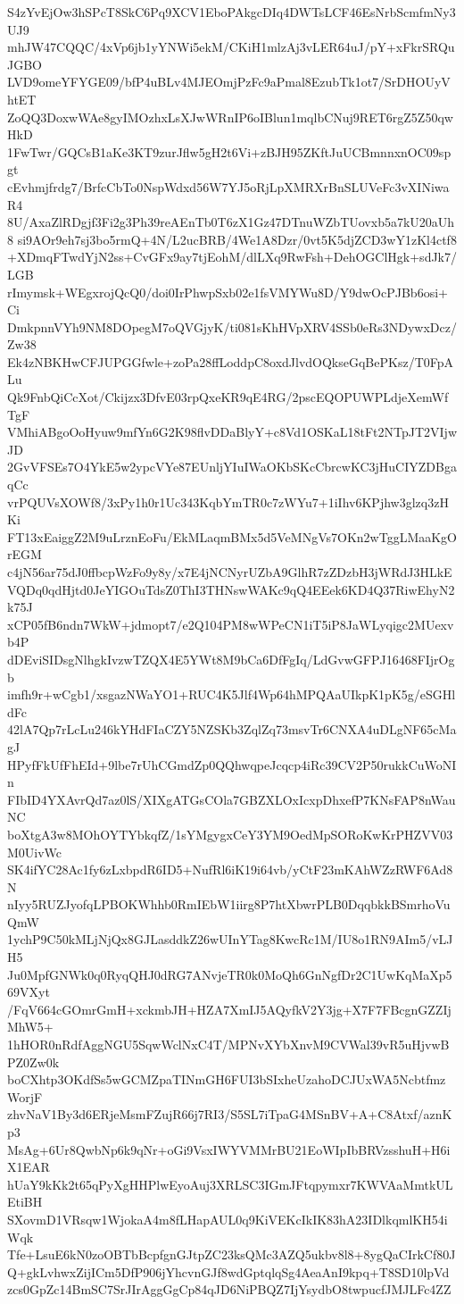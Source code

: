 S4zYvEjOw3hSPcT8SkC6Pq9XCV1EboPAkgcDIq4DWTsLCF46EsNrbScmfmNy3UJ9
mhJW47CQQC/4xVp6jb1yYNWi5ekM/CKiH1mlzAj3vLER64uJ/pY+xFkrSRQuJGBO
LVD9omeYFYGE09/bfP4uBLv4MJEOmjPzFc9aPmal8EzubTk1ot7/SrDHOUyVhtET
ZoQQ3DoxwWAe8gyIMOzhxLsXJwWRnIP6oIBlun1mqlbCNuj9RET6rgZ5Z50qwHkD
1FwTwr/GQCsB1aKe3KT9zurJflw5gH2t6Vi+zBJH95ZKftJuUCBmnnxnOC09spgt
cEvhmjfrdg7/BrfcCbTo0NspWdxd56W7YJ5oRjLpXMRXrBnSLUVeFc3vXINiwaR4
8U/AxaZlRDgjf3Fi2g3Ph39reAEnTb0T6zX1Gz47DTnuWZbTUovxb5a7kU20aUh8
si9AOr9eh7sj3bo5rmQ+4N/L2ucBRB/4We1A8Dzr/0vt5K5djZCD3wY1zKl4ctf8
+XDmqFTwdYjN2ss+CvGFx9ay7tjEohM/dlLXq9RwFsh+DehOGClHgk+sdJk7/LGB
rImymsk+WEgxrojQcQ0/doi0IrPhwpSxb02e1fsVMYWu8D/Y9dwOcPJBb6osi+Ci
DmkpnnVYh9NM8DOpegM7oQVGjyK/ti081sKhHVpXRV4SSb0eRs3NDywxDcz/Zw38
Ek4zNBKHwCFJUPGGfwle+zoPa28ffLoddpC8oxdJlvdOQkseGqBePKsz/T0FpALu
Qk9FnbQiCcXot/Ckijzx3DfvE03rpQxeKR9qE4RG/2pscEQOPUWPLdjeXemWfTgF
VMhiABgoOoHyuw9mfYn6G2K98flvDDaBlyY+c8Vd1OSKaL18tFt2NTpJT2VIjwJD
2GvVFSEs7O4YkE5w2ypcVYe87EUnljYIuIWaOKbSKcCbrcwKC3jHuCIYZDBgaqCc
vrPQUVsXOWf8/3xPy1h0r1Uc343KqbYmTR0c7zWYu7+1iIhv6KPjhw3glzq3zHKi
FT13xEaiggZ2M9uLrznEoFu/EkMLaqmBMx5d5VeMNgVs7OKn2wTggLMaaKgOrEGM
c4jN56ar75dJ0ffbcpWzFo9y8y/x7E4jNCNyrUZbA9GlhR7zZDzbH3jWRdJ3HLkE
VQDq0qdHjtd0JeYIGOuTdsZ0ThI3THNswWAKc9qQ4EEek6KD4Q37RiwEhyN2k75J
xCP05fB6ndn7WkW+jdmopt7/e2Q104PM8wWPeCN1iT5iP8JaWLyqigc2MUexvb4P
dDEviSIDsgNlhgkIvzwTZQX4E5YWt8M9bCa6DfFgIq/LdGvwGFPJ16468FIjrOgb
imfh9r+wCgb1/xsgazNWaYO1+RUC4K5Jlf4Wp64hMPQAaUIkpK1pK5g/eSGHldFc
42lA7Qp7rLcLu246kYHdFIaCZY5NZSKb3ZqlZq73msvTr6CNXA4uDLgNF65cMagJ
HPyfFkUfFhEId+9lbe7rUhCGmdZp0QQhwqpeJcqcp4iRc39CV2P50rukkCuWoNIn
FIbID4YXAvrQd7az0lS/XIXgATGsCOla7GBZXLOxIcxpDhxefP7KNsFAP8nWauNC
boXtgA3w8MOhOYTYbkqfZ/1sYMgygxCeY3YM9OedMpSORoKwKrPHZVV03M0UivWc
SK4ifYC28Ac1fy6zLxbpdR6ID5+NufRl6iK19i64vb/yCtF23mKAhWZzRWF6Ad8N
nIyy5RUZJyofqLPBOKWhhb0RmIEbW1iirg8P7htXbwrPLB0DqqbkkBSmrhoVuQmW
1ychP9C50kMLjNjQx8GJLasddkZ26wUInYTag8KwcRc1M/IU8o1RN9AIm5/vLJH5
Ju0MpfGNWk0q0RyqQHJ0dRG7ANvjeTR0k0MoQh6GnNgfDr2C1UwKqMaXp569VXyt
/FqV664cGOmrGmH+xckmbJH+HZA7XmIJ5AQyfkV2Y3jg+X7F7FBcgnGZZIjMhW5+
1hHOR0nRdfAggNGU5SqwWclNxC4T/MPNvXYbXnvM9CVWal39vR5uHjvwBPZ0Zw0k
boCXhtp3OKdfSs5wGCMZpaTINmGH6FUI3bSIxheUzahoDCJUxWA5NcbtfmzWorjF
zhvNaV1By3d6ERjeMsmFZujR66j7RI3/S5SL7iTpaG4MSnBV+A+C8Atxf/aznKp3
MsAg+6Ur8QwbNp6k9qNr+oGi9VsxIWYVMMrBU21EoWIpIbBRVzsshuH+H6iX1EAR
hUaY9kKk2t65qPyXgHHPlwEyoAuj3XRLSC3IGmJFtqpymxr7KWVAaMmtkULEtiBH
SXovmD1VRsqw1WjokaA4m8fLHapAUL0q9KiVEKcIkIK83hA23IDlkqmlKH54iWqk
Tfe+LsuE6kN0zoOBTbBcpfgnGJtpZC23ksQMc3AZQ5ukbv8l8+8ygQaCIrkCf80J
Q+gkLvhwxZijICm5DfP906jYhcvnGJf8wdGptqlqSg4AeaAnI9kpq+T8SD10lpVd
zcs0GpZc14BmSC7SrJIrAggGgCp84qJD6NiPBQZ7IjYsydbO8twpucfJMJLFc4ZZ
